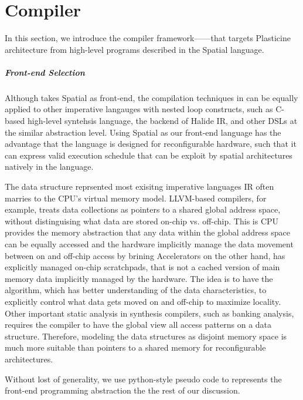 \chapter{Compiler} \label{sec:compiler}

In this section, we introduce the compiler framework---\name---that targets Plasticine
architecture from high-level programs described in the Spatial language. 

 
\paragraph{Front-end Selection} 
Although \name takes Spatial as front-end, the compilation techniques in \name can be equally
applied to other imperative langauges with nested loop constructs, such as C-based high-level
syntehsis language, the backend of Halide IR, and other DSLs at the similar abstraction level. 
Using Spatial as our front-end language has the advantage that the language is designed for
reconfigurable hardware, such that it can express valid execution schedule that can be exploit by
spatial architectures natively in the language.

The data structure reprsented most exisitng imperative languages IR often marries to the
CPU's virtual memory model. LLVM-based compilers, for example, treats data collections as pointers to a shared
global address space, without distinguising what data are stored on-chip vs. off-chip.
This is CPU provides the memory abstraction that any data within the global address space 
can be equally accessed and the hardware implicitly manage the data movement between on and off-chip 
access by brining
Accelerators on the other hand, has explicitly managed on-chip scratchpads, that is not a cached
version of main memory data implicitly managed by the hardware.
The idea is to have the algorithm, which has better understanding of the data characteristics, to
explicitly control what data gets moved on and off-chip to maximize locality.
Other important static analysis in synthesis compilers, such as banking analysis, requires the
compiler to have the global view all access patterns on a data structure.
Therefore, modeling the data structures as disjoint memory space is much more suitable 
than pointers to a shared memory for reconfigurable architectures.

Without lost of generality, we use python-style pseudo code to represents the front-end programming
abstraction the the rest of our discussion.

